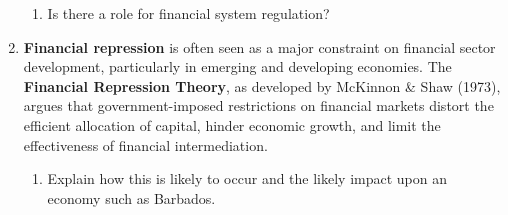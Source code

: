 \begin{enumerate}
\begin{enumerate}
        \item Is there a role for financial system regulation?
    \end{enumerate}

    \item \textbf{Financial repression} is often seen as a major constraint on financial sector
    development, particularly in emerging and developing economies. The
    \textbf{Financial Repression Theory}, as developed by McKinnon \& Shaw (1973),
    argues that government-imposed restrictions on financial markets distort the
    efficient allocation of capital, hinder economic growth, and limit the
    effectiveness of financial intermediation. 
    
    \begin{enumerate}
        \item Explain how this is likely to occur and
        the likely impact upon an economy such as Barbados.
    \end{enumerate}

\end{enumerate}
